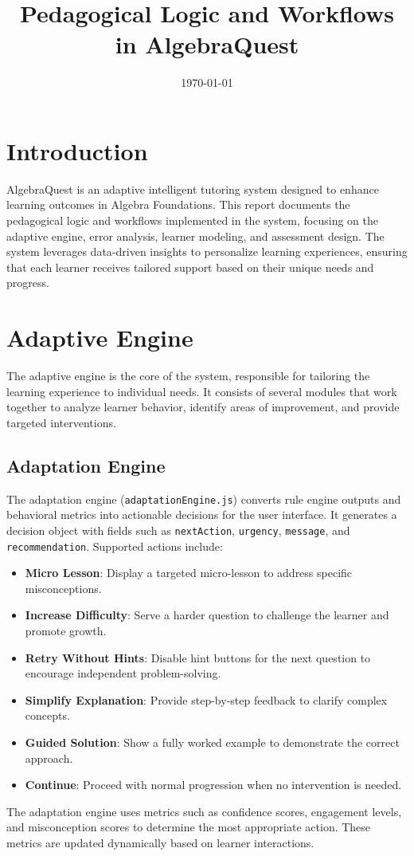 \documentclass{article}
\title{Pedagogical Logic and Workflows in AlgebraQuest}
\author{}
\date{\today}
\begin{document}
\maketitle

\tableofcontents

\section{Introduction}
AlgebraQuest is an adaptive intelligent tutoring system designed to enhance learning outcomes in Algebra Foundations. This report documents the pedagogical logic and workflows implemented in the system, focusing on the adaptive engine, error analysis, learner modeling, and assessment design. The system leverages data-driven insights to personalize learning experiences, ensuring that each learner receives tailored support based on their unique needs and progress.

\section{Adaptive Engine}
The adaptive engine is the core of the system, responsible for tailoring the learning experience to individual needs. It consists of several modules that work together to analyze learner behavior, identify areas of improvement, and provide targeted interventions.

\subsection{Adaptation Engine}
The adaptation engine (\texttt{adaptationEngine.js}) converts rule engine outputs and behavioral metrics into actionable decisions for the user interface. It generates a decision object with fields such as \texttt{nextAction}, \texttt{urgency}, \texttt{message}, and \texttt{recommendation}. Supported actions include:
\begin{itemize}
    \item \textbf{Micro Lesson}: Display a targeted micro-lesson to address specific misconceptions.
    \item \textbf{Increase Difficulty}: Serve a harder question to challenge the learner and promote growth.
    \item \textbf{Retry Without Hints}: Disable hint buttons for the next question to encourage independent problem-solving.
    \item \textbf{Simplify Explanation}: Provide step-by-step feedback to clarify complex concepts.
    \item \textbf{Guided Solution}: Show a fully worked example to demonstrate the correct approach.
    \item \textbf{Continue}: Proceed with normal progression when no intervention is needed.
\end{itemize}
The adaptation engine uses metrics such as confidence scores, engagement levels, and misconception scores to determine the most appropriate action. These metrics are updated dynamically based on learner interactions.
\end{document}

